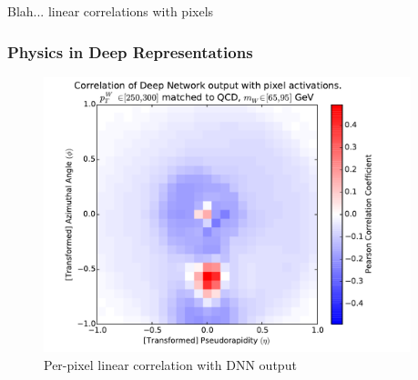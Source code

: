 \documentclass{article}
\begin{document}
Blah... linear correlations with pixels





\subsubsection{Physics in Deep Representations} %
\label{ssub:physics_in_deep_representations}


\begin{figure}[!htbp]
  \centering
  \includegraphics[width=0.95\textwidth]{figures/pixel-activations-corr.pdf}
  \caption{Per-pixel linear correlation with DNN output}
  \label{fig:corr}
\end{figure}
\end{document}
